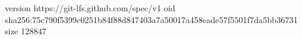 version https://git-lfs.github.com/spec/v1
oid sha256:75c790f5399c0251b84f88d847403a7a50017a458eade57f5501f7da5bb36731
size 128847
